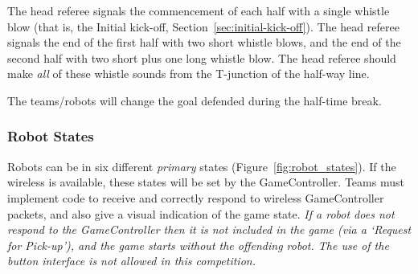 The head referee signals the commencement of each half with a single whistle blow (that is, the Initial kick-off, \cf Section~\ref{sec:initial-kick-off}).
The head referee signals the end of the first half with two short whistle blows, and the end of the second half with two short plus one long whistle blow.
The head referee should make \textit{all} of these whistle sounds from the T-junction of the half-way line.

The teams/robots will change the goal defended during the half-time break.

\subsubsection{Robot States}
\label{sec:robot_states}

Robots can be in six different \emph{primary} states (\cf Figure~\ref{fig:robot_states}). If the wireless is available, these states will be set by the GameController. Teams must implement code to receive and correctly respond to wireless GameController packets, and also give a visual indication of the game state.
\emph{If a robot does not respond to the GameController then it is not included in the game (via a `Request for Pick-up'), and the game starts without the offending robot. The use of the button interface is not allowed in this competition.}

